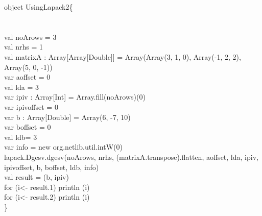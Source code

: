\documentclass {article}
\begin{document}
\begin{appendices}
object UsingLapack2\{ \\
\\
\\
val noArows = 3\\
val nrhs = 1\\
val matrixA : Array[Array[Double]] = Array(Array(3, 1, 0), Array(-1, 2, 2), Array(5, 0, -1))\\
var aoffset = 0\\
val lda = 3\\
var ipiv : Array[Int] = Array.fill(noArows)(0)\\
var ipivoffset = 0\\
var b  : Array[Double] = Array(6, -7, 10)\\
var boffset = 0\\
val ldb= 3\\
var info = new org.netlib.util.intW(0)\\
lapack.Dgesv.dgesv(noArows, nrhs, (matrixA.transpose).flatten, aoffset, lda, ipiv, ipivoffset, b, boffset, ldb, info)\\
val result = (b, ipiv)\\
for (i<- result.\underline{\space}1) println (i)\\
for (i<- result.\underline{\space}2) println (i)\\
\}

\end{appendices}
\end{document}
